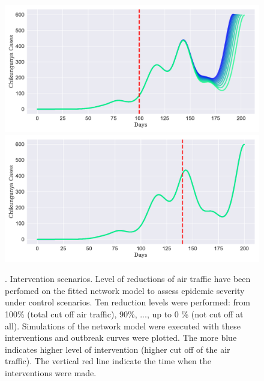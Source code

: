 \documentclass[11pt]{article}
\begin{document}
\begin{figure}[ht]
\includegraphics[scale=.24]{./interv_100}
\includegraphics[scale=.24]{./interv_140}
\caption{\small . Intervention scenarios. Level of reductions of air  traffic have been perfomed on the fitted network model to assess epidemic severity under control scenarios. Ten reduction levels were performed: from 100\% (total cut off air traffic), 90\%, ..., up to 0 \% (not cut off at all). Simulations of the network model were executed with these interventions and outbreak curves were plotted. The more blue indicates higher level of intervention (higher cut off of the air traffic). The vertical red line indicate the time when the interventions were made.}
\label{fig:interventions}
\end{figure}
\vspace{5cm}
%
\end{document}
